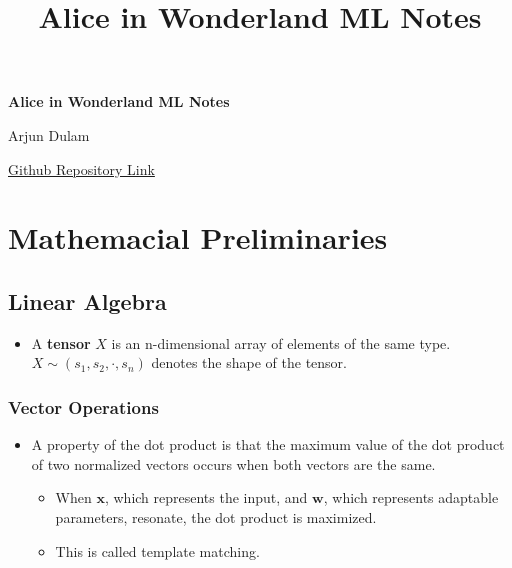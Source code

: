 \documentclass{article}
\title{\vspace{-3cm}Alice in Wonderland ML Notes}
\author{}
\date{}
\newcommand{\tbf}[1]{\textbf{#1}}
\newcommand{\mbf}[1]{\mathbf{#1}}
\begin{document}
\begin{titlepage}
    \centering
    \vspace*{2cm} %

    {\Huge\textbf{Alice in Wonderland ML Notes}\par} %
    \vspace{1.5cm} %

    {\Large Arjun Dulam\par} %
    \vspace{1.5cm} %

    {\large \href{https://github.com/Arjun-Dulam/Alice-in-Wonderland-ML}{Github Repository Link} \par} %
    \vfill %
\end{titlepage}
        
\tableofcontents
\newpage

\setcounter{section}{1}
\section{Mathemacial Preliminaries}

\subsection{Linear Algebra}

\begin{itemize}
    \item A \tbf{tensor} $X$ is an n-dimensional array of elements of the same type. $X \sim (s_1,s_2,\cdot,s_n)$ denotes the shape of the tensor.
\end{itemize}

\subsubsection{Vector Operations}

\begin{itemize}
    \item A property of the dot product is that the maximum value of the dot product of two normalized vectors occurs when both vectors are the same. 
    \begin{itemize}
        \item When $\mbf{x}$, which represents the input, and $\mbf{w}$, which represents adaptable parameters, resonate, the dot product is maximized.
        \item This is called template matching. 
    \end{itemize} 
\end{itemize}
\end{document}
